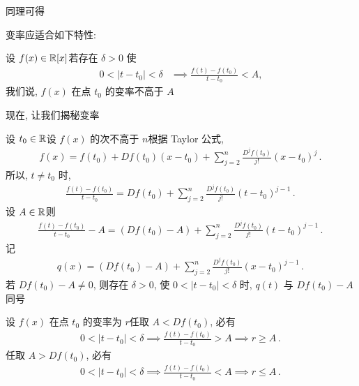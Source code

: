 同理可得

\begin{proposition}
    变率应适合如下特性:

    设 $f (x) \in \mathbb{R}[x]$\period 若存在 $\delta > 0$ 使
    \begin{align*}
        0 < |t - t_0| < \delta & \implies \frac{f(t) - f(t_0)}{t - t_0} < A,
    \end{align*}
    我们说, $f (x)$ 在点 $t_0$ 的变率不高于 $A$\period
\end{proposition}

现在, 让我们揭秘变率\period

设 $t_0 \in \mathbb{R}$\period 设 $f(x)$ 的次不高于 $n$\period 根据 Taylor 公式,
\begin{align*}
    f(x) = f(t_0) + Df(t_0) (x - t_0) + \sum_{j = 2}^{n} \frac{D^j f(t_0)}{j!} (x - t_0)^j \period
\end{align*}
所以, $t \neq t_0$ 时,
\begin{align*}
    \frac{f(t) - f(t_0)}{t - t_0} = Df(t_0) + \sum_{j = 2}^{n} \frac{D^j f(t_0)}{j!} (t - t_0)^{j - 1} \period
\end{align*}
设 $A \in \mathbb{R}$\period 则
\begin{align*}
    \frac{f(t) - f(t_0)}{t - t_0} - A = (Df(t_0) - A) + \sum_{j = 2}^{n} \frac{D^j f(t_0)}{j!} (t - t_0)^{j - 1} \period
\end{align*}
记
\begin{align*}
    q(x) = (Df(t_0) - A) + \sum_{j = 2}^{n} \frac{D^j f(t_0)}{j!} (x - t_0)^{j - 1} \period
\end{align*}
若 $Df(t_0) - A \neq 0$, 则存在 $\delta > 0$, 使 $0 < |t - t_0| < \delta$ 时, $q(t)$ 与 $Df(t_0) - A$ 同号\period

设 $f(x)$ 在点 $t_0$ 的变率为 $r$\period 任取 $A < Df(t_0)$, 必有
\begin{align*}
    0 < |t - t_0| < \delta \implies \frac{f(t) - f(t_0)}{t - t_0} > A \implies r \geq A \period
\end{align*}
任取 $A > Df(t_0)$, 必有
\begin{align*}
    0 < |t - t_0| < \delta \implies \frac{f(t) - f(t_0)}{t - t_0} < A \implies r \leq A \period
\end{align*}

